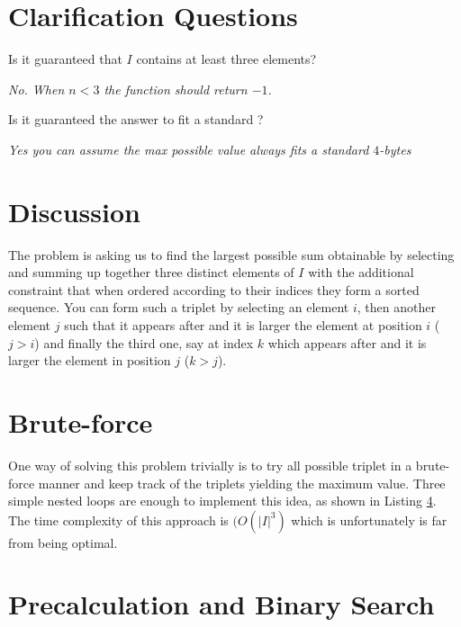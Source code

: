 \section{Clarification Questions}

\begin{QandA}
	\item  Is it guaranteed that $I$ contains at least three elements?
	\begin{answered}
		\textit{No. When $n < 3$ the function should return $-1$.}
	\end{answered}
	\item  Is it guaranteed the answer to fit a standard ?
	\begin{answered}
		\textit{Yes you can assume the max possible value always fits a standard $4$-bytes }
	\end{answered}
\end{QandA}

\section{Discussion}
\label{max_triplet:sec:discussion}
The problem is asking us to find the largest possible sum obtainable by selecting and summing up together
three distinct elements of $I$ with the additional constraint that when ordered according to their indices 
they form a sorted sequence. 
You can form such a triplet by selecting an element $i$,
then another element $j$ such that it appears after and it is larger the element at position $i$ ($j>i$)  and finally the third one, say at index $k$
which appears after and it is larger the element in position $j$ ($k>j$).

\section{Brute-force}
\label{max_triplet:sec:bruteforce}
One way of solving this problem trivially is to try all possible triplet in a brute-force manner and keep track of the triplets yielding the maximum value.
Three simple nested loops are enough to implement this idea, as shown in Listing \ref{}. The time complexity of this approach is $(O(|I|^3)$ which is unfortunately is far from being optimal.





\section{Precalculation and Binary Search}
